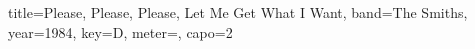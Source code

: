 \documentclass{skrul-leadsheet}
\begin{document}
\begin{song}[transpose-capo=true]{title={Please, Please, Please, Let Me Get What I Want}, band={The Smiths}, year={1984}, key={D}, meter={},  capo={2}}



\end{song}
\end{document}
